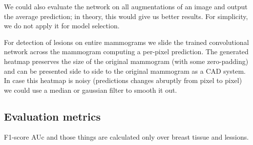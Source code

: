 	We could also evaluate the network on all augmentations of an image and output the average prediction; in theory, this would give us better results. For simplicity, we do not apply it for model selection.

	For detection of lesions on entire mammograms we slide the trained convolutional network across the mammogram computing a per-pixel prediction. The generated heatmap preserves the size of the original mammogram (with some zero-padding) and can be presented side to side to the original mammogram as a CAD system. In case this heatmap is noisy (predictions changes abruptly from pixel to pixel) we could use a median or gaussian filter to smooth it out.%
	\subsection{Evaluation metrics}
F1-score AUc and those things are calculated only over breast tissue and lessions.
